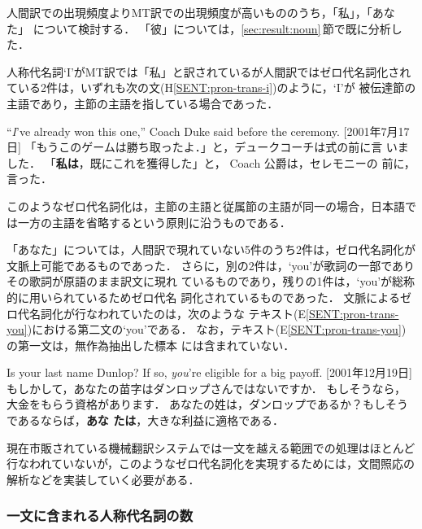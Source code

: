 人間訳での出現頻度よりMT訳での出現頻度が高いもののうち，「私」，「あなた」
について検討する．
「彼」については，\ref{sec:result:noun}\,節で既に分析した．

人称代名詞`I'がMT訳では「私」と訳されているが人間訳ではゼロ代名詞化され
ている2件は，いずれも次の文(H\ref{SENT:pron-trans-i})のように，`I'が
被伝達節の主語であり，主節の主語を指している場合であった．
\begin{SENT2}
\sentE ``{\it I}'ve already won this one,'' Coach Duke said before the 
ceremony. [2001年7月17日]
\sentH 「もうこのゲームは勝ち取ったよ．」と，デュークコーチは式の前に言
いました．
\sentM 「{\bf 私は}，既にこれを獲得した」と， Coach 公爵は，セレモニーの
前に，言った．
\label{SENT:pron-trans-i}
\end{SENT2}
このようなゼロ代名詞化は，主節の主語と従属節の主語が同一の場合，日本語で
は一方の主語を省略するという原則に沿うものである．

「あなた」については，人間訳で現れていない5件のうち2件は，ゼロ代名詞化が
文脈上可能であるものであった．
さらに，別の2件は，`you'が歌詞の一部でありその歌詞が原語のまま訳文に現れ
ているものであり，残りの1件は，`you'が総称的に用いられているためゼロ代名
詞化されているものであった．
文脈によるゼロ代名詞化が行なわれていたのは，次のような
テキスト(E\ref{SENT:pron-trans-you})における第二文の`you'である．
なお，テキスト(E\ref{SENT:pron-trans-you})の第一文は，無作為抽出した標本
には含まれていない．
\begin{SENT2}
\sentE Is your last name Dunlop? If so, {\it you}'re eligible for a big 
payoff. [2001年12月19日]
\sentH もしかして，あなたの苗字はダンロップさんではないですか． 
もしそうなら，大金をもらう資格があります． 
\sentM あなたの姓は，ダンロップであるか？もしそうであるならば，{\bf あな
たは}，大きな利益に適格である．
\label{SENT:pron-trans-you}
\end{SENT2}

現在市販されている機械翻訳システムでは一文を越える範囲での処理はほとんど
行なわれていないが，このようなゼロ代名詞化を実現するためには，文間照応の
解析などを実装していく必要がある．


\subsubsection{一文に含まれる人称代名詞の数}
\label{sec:result:pron:num-of-pron}

